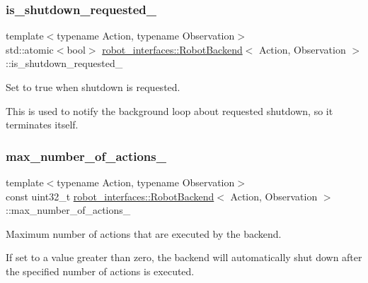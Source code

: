 \subsubsection{\texorpdfstring{is\+\_\+shutdown\+\_\+requested\+\_\+}{is\_shutdown\_requested\_}}
{\footnotesize\ttfamily template$<$typename Action, typename Observation$>$ \\
std\+::atomic$<$bool$>$ \hyperlink{classrobot__interfaces_1_1RobotBackend}{robot\+\_\+interfaces\+::\+Robot\+Backend}$<$ Action, Observation $>$\+::is\+\_\+shutdown\+\_\+requested\+\_\+\hspace{0.3cm}{\ttfamily [private]}}



Set to true when shutdown is requested. 

This is used to notify the background loop about requested shutdown, so it terminates itself. \mbox{\label{classrobot__interfaces_1_1RobotBackend_a7cac555549bff96a32da042a97919d47}} 
\subsubsection{\texorpdfstring{max\+\_\+number\+\_\+of\+\_\+actions\+\_\+}{max\_number\_of\_actions\_}}
{\footnotesize\ttfamily template$<$typename Action, typename Observation$>$ \\
const uint32\+\_\+t \hyperlink{classrobot__interfaces_1_1RobotBackend}{robot\+\_\+interfaces\+::\+Robot\+Backend}$<$ Action, Observation $>$\+::max\+\_\+number\+\_\+of\+\_\+actions\+\_\+\hspace{0.3cm}{\ttfamily [private]}}



Maximum number of actions that are executed by the backend. 

If set to a value greater than zero, the backend will automatically shut down after the specified number of actions is executed. \mbox{\label{classrobot__interfaces_1_1RobotBackend_a81610183c52c9fe2088304bbd3b6f83f}} 
